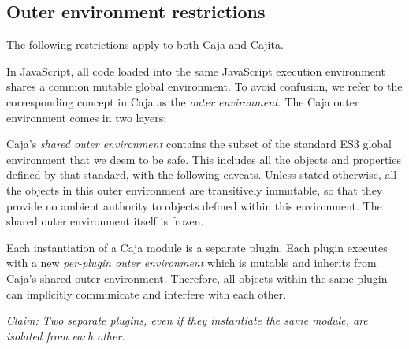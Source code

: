 \documentclass[letterpaper,twocolumn,10pt]{article}
\begin{document}
\subsection{Outer environment restrictions}
\label{subsec:outer-env}

The following restrictions apply to both Caja and Cajita.

In JavaScript, all code loaded into the same JavaScript execution environment 
shares a common mutable global environment. To avoid confusion, we refer to 
the corresponding concept in Caja as the \emph{outer environment}. The Caja 
outer environment comes in two layers:

Caja's \emph{shared outer environment} contains the subset of the standard 
ES3 global environment that we deem to be safe. This includes all the objects 
and properties defined by that standard, with the following caveats. Unless 
stated otherwise, all the objects in this outer environment are transitively 
immutable, so that they provide no ambient authority to objects defined 
within this environment. The shared outer environment itself is frozen.

Each instantiation of a Caja module is a separate plugin. Each plugin 
executes with a new \emph{per-plugin outer environment} which is mutable and 
inherits from Caja's shared outer environment. Therefore, all objects within 
the same plugin can implicitly communicate and interfere with each other. 

\emph{Claim: Two separate plugins, even if they instantiate the same module, 
are isolated from each other.}
\end{document}
